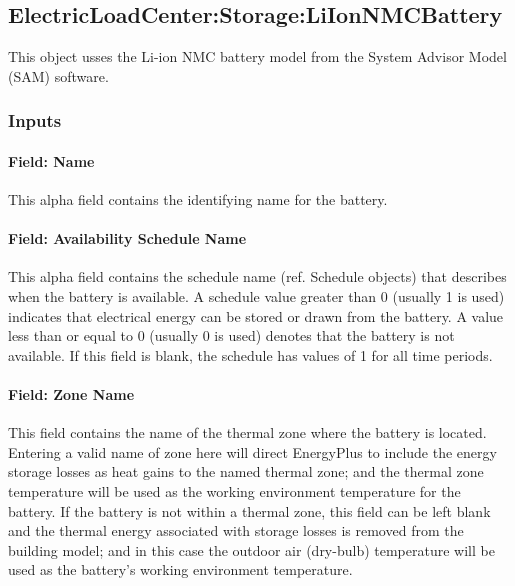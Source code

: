 \subsection{ElectricLoadCenter:Storage:LiIonNMCBattery}\label{electricloadcenterstorage-liionbattery}

This object usses the Li-ion NMC battery model from the System Advisor Model (SAM) software.

\subsubsection{Inputs}

\paragraph{Field: Name}\label{liion-name}

This alpha field contains the identifying name for the battery.

\paragraph{Field: Availability Schedule Name}\label{liion-avail-sched-name}

This alpha field contains the schedule name (ref. Schedule objects) that describes when the battery is available. A schedule value greater than 0 (usually 1 is used) indicates that electrical energy can be stored or drawn from the battery. A value less than or equal to 0 (usually 0 is used) denotes that the battery is not available. If this field is blank, the schedule has values of 1 for all time periods.

\paragraph{Field: Zone Name}\label{liion-zone-name}

This field contains the name of the thermal zone where the battery is located. Entering a valid name of zone here will direct EnergyPlus to include the energy storage losses as heat gains to the named thermal zone; and the thermal zone temperature will be used as the working environment temperature for the battery. If the battery is not within a thermal zone, this field can be left blank and the thermal energy associated with storage losses is removed from the building model; and in this case the outdoor air (dry-bulb) temperature will be used as the battery's working environment temperature.


